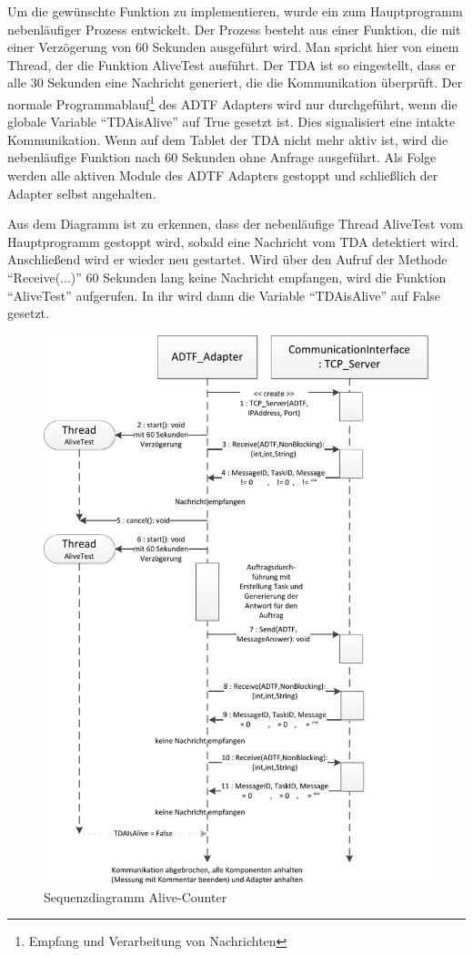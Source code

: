 \documentclass[12pt,a4paper]{report}
\begin{document}
Um die gewünschte Funktion zu implementieren, wurde ein zum Hauptprogramm nebenläufiger Prozess entwickelt. Der Prozess besteht aus einer Funktion, die mit einer Verzögerung von 60 Sekunden ausgeführt wird. Man spricht hier von einem Thread, der die Funktion AliveTest ausführt. Der TDA ist so eingestellt, dass er alle 30 Sekunden eine Nachricht generiert, die die Kommunikation überprüft. Der normale Programmablauf\footnote{Empfang und Verarbeitung von Nachrichten} des ADTF Adapters wird nur durchgeführt, wenn die globale Variable "`TDAisAlive"' auf True gesetzt ist. Dies signalisiert eine intakte Kommunikation. Wenn auf dem Tablet der TDA nicht mehr aktiv ist, wird die nebenläufige Funktion nach 60 Sekunden ohne Anfrage ausgeführt. Als Folge werden alle aktiven Module des ADTF Adapters gestoppt und schließlich der Adapter selbst angehalten.

Aus dem Diagramm ist zu erkennen, dass der nebenläufige Thread AliveTest vom Hauptprogramm gestoppt wird, sobald eine Nachricht vom TDA detektiert wird. Anschlie\ss end wird er wieder neu gestartet. Wird über den Aufruf der Methode "`Receive(...)"' 60 Sekunden lang keine Nachricht empfangen, wird die Funktion "`AliveTest"' aufgerufen. In ihr wird dann die Variable "`TDAisAlive"' auf False gesetzt.
\begin{figure}
\begin{center}
\includegraphics[scale=1.05]{Darstellungen/SequenzAliveCounter}
\caption{Sequenzdiagramm Alive-Counter}\label{pic:Sequenz AliveCounter}
\end{center}
\end{figure}
\end{document}
